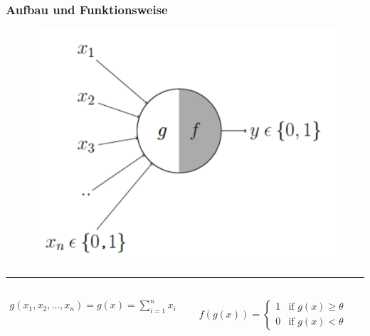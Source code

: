 \begin{frame}
\frametitle{Aufbau und Funktionsweise}
\begin{figure}
	\includegraphics[width=.5\linewidth]{./geschichtliches/mcCullochPittsNeuron/img/aufbau_alpha}
\end{figure}

\hrule

\begin{columns}

\begin{align*}
g(x_1, x_2, \dots , x_n) = g(x) = \sum_{i=1}^n x_i
\end{align*}

\begin{align*} \label{eq:aktFkt2}
f(g(x)) =\begin{cases}
	1 & \mbox{if } g(x) \geq \theta \\
    0 & \mbox{if } g(x) < \theta
  \end{cases}
\end{align*}
\end{columns}




\end{frame}


